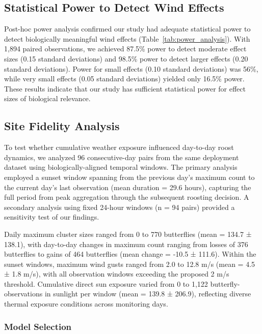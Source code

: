\subsection{Statistical Power to Detect Wind Effects}

Post-hoc power analysis confirmed our study had adequate statistical power to detect biologically meaningful wind effects (Table~\ref{tab:power_analysis}). With 1,894 paired observations, we achieved 87.5\% power to detect moderate effect sizes (0.15 standard deviations) and 98.5\% power to detect larger effects (0.20 standard deviations). Power for small effects (0.10 standard deviations) was 56\%, while very small effects (0.05 standard deviations) yielded only 16.5\% power. These results indicate that our study has sufficient statistical power for effect sizes of biological relevance.



\subsection{Site Fidelity Analysis}

To test whether cumulative weather exposure influenced day-to-day roost dynamics, we analyzed 96 consecutive-day pairs from the same deployment dataset using biologically-aligned temporal windows. The primary analysis employed a sunset window spanning from the previous day's maximum count to the current day's last observation (mean duration = 29.6 hours), capturing the full period from peak aggregation through the subsequent roosting decision. A secondary analysis using fixed 24-hour windows (n = 94 pairs) provided a sensitivity test of our findings.

Daily maximum cluster sizes ranged from 0 to 770 butterflies (mean = 134.7 ± 138.1), with day-to-day changes in maximum count ranging from losses of 376 butterflies to gains of 464 butterflies (mean change = -10.5 ± 111.6). Within the sunset windows, maximum wind gusts ranged from 2.0 to 12.8 m/s (mean = 4.5 ± 1.8 m/s), with all observation windows exceeding the proposed 2 m/s threshold. Cumulative direct sun exposure varied from 0 to 1,122 butterfly-observations in sunlight per window (mean = 139.8 ± 206.9), reflecting diverse thermal exposure conditions across monitoring days.

\subsubsection{Model Selection}

